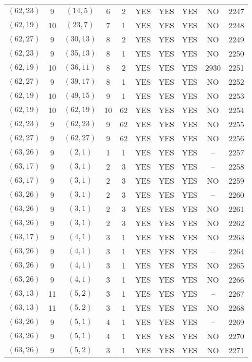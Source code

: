 \begin{longtable}{|c|c|c|c|c|c|c|c|c|c|}
$(62, 23)$ & 9 & $(14, 5)$ & 6 & 2 & YES & YES & YES & NO & 2247\\
$(62, 19)$ & 10 & $(23, 7)$ & 7 & 1 & YES & YES & YES & NO & 2248\\
$(62, 27)$ & 9 & $(30, 13)$ & 8 & 2 & YES & YES & YES & NO & 2249\\
$(62, 23)$ & 9 & $(35, 13)$ & 8 & 1 & YES & YES & YES & NO & 2250\\
$(62, 19)$ & 10 & $(36, 11)$ & 8 & 2 & YES & YES & YES & 2930 & 2251\\
$(62, 27)$ & 9 & $(39, 17)$ & 8 & 1 & YES & YES & YES & NO & 2252\\
$(62, 19)$ & 10 & $(49, 15)$ & 9 & 1 & YES & YES & YES & NO & 2253\\
$(62, 19)$ & 10 & $(62, 19)$ & 10 & 62 & YES & YES & YES & NO & 2254\\
$(62, 23)$ & 9 & $(62, 23)$ & 9 & 62 & YES & YES & YES & NO & 2255\\
$(62, 27)$ & 9 & $(62, 27)$ & 9 & 62 & YES & YES & YES & NO & 2256\\
$(63, 26)$ & 9 & $(2, 1)$ & 1 & 1 & YES & YES & YES & -- & 2257\\
$(63, 17)$ & 9 & $(3, 1)$ & 2 & 3 & YES & YES & YES & -- & 2258\\
$(63, 17)$ & 9 & $(3, 1)$ & 2 & 3 & YES & YES & YES & NO & 2259\\
$(63, 26)$ & 9 & $(3, 1)$ & 2 & 3 & YES & YES & YES & -- & 2260\\
$(63, 26)$ & 9 & $(3, 1)$ & 2 & 3 & YES & YES & YES & NO & 2261\\
$(63, 26)$ & 9 & $(3, 1)$ & 2 & 3 & YES & YES & YES & NO & 2262\\
$(63, 17)$ & 9 & $(4, 1)$ & 3 & 1 & YES & YES & YES & NO & 2263\\
$(63, 26)$ & 9 & $(4, 1)$ & 3 & 1 & YES & YES & YES & -- & 2264\\
$(63, 26)$ & 9 & $(4, 1)$ & 3 & 1 & YES & YES & YES & NO & 2265\\
$(63, 26)$ & 9 & $(4, 1)$ & 3 & 1 & YES & YES & YES & NO & 2266\\
$(63, 13)$ & 11 & $(5, 2)$ & 3 & 1 & YES & YES & YES & -- & 2267\\
$(63, 13)$ & 11 & $(5, 2)$ & 3 & 1 & YES & YES & YES & NO & 2268\\
$(63, 26)$ & 9 & $(5, 1)$ & 4 & 1 & YES & YES & YES & -- & 2269\\
$(63, 26)$ & 9 & $(5, 1)$ & 4 & 1 & YES & YES & YES & NO & 2270\\
$(63, 26)$ & 9 & $(5, 2)$ & 3 & 1 & YES & YES & YES & NO & 2271\\

\end{longtable}

